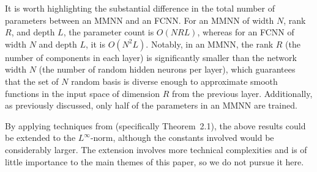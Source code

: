 \documentclass[11pt,a4paper]{article}
\let\dots\cdots
\begin{document}
\begin{remark}
    It is worth highlighting the substantial difference in the total number of parameters between an MMNN and an FCNN. For an MMNN of width \( N \), rank \( R \), and depth \( L \), the parameter count is \( O(NRL) \), whereas for an FCNN of width \( N \) and depth \( L \), it is \( O(N^2L) \). Notably, in an MMNN, the rank \( R \) (the number of components in each layer) is significantly smaller than the network width \( N \) (the number of random hidden neurons per layer), which guarantees that the set of $N$ random basis is diverse enough to approximate smooth functions in the input space of dimension $R$ from the previous layer. Additionally, as previously discussed, only half of the parameters in an MMNN are trained.
\end{remark}

\begin{remark}
By applying techniques from \cite{shijun:smooth:functions} (specifically Theorem~2.1), the above results could be extended to the \( L^\infty \)-norm, although the constants involved would be considerably larger. The extension involves more technical complexities and is of little importance to the main themes of this paper, so we do not pursue it here.
\end{remark}

\end{document}
